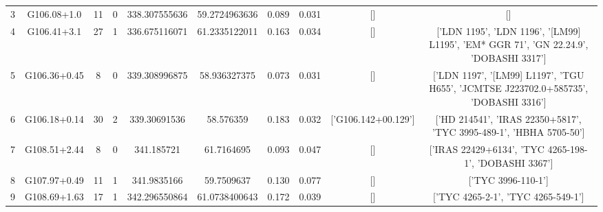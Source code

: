 \begin{table}
\begin{tabular}{cccccccccc}
3 & G106.08+1.0 & 11 & 0 & 338.307555636 & 59.2724963636 & 0.089 & 0.031 & [] & [] \\
4 & G106.41+3.1 & 27 & 1 & 336.675116071 & 61.2335122011 & 0.163 & 0.034 & [] & ['LDN 1195', 'LDN 1196', '[LM99] L1195', 'EM* GGR   71', 'GN 22.24.9', 'DOBASHI 3317'] \\
5 & G106.36+0.45 & 8 & 0 & 339.308996875 & 58.936327375 & 0.073 & 0.031 & [] & ['LDN 1197', '[LM99] L1197', 'TGU H655', 'JCMTSE J223702.0+585735', 'DOBASHI 3316'] \\
6 & G106.18+0.14 & 30 & 2 & 339.30691536 & 58.576359 & 0.183 & 0.032 & ['G106.142+00.129'] & ['HD 214541', 'IRAS 22350+5817', 'TYC 3995-489-1', 'HBHA 5705-50'] \\
7 & G108.51+2.44 & 8 & 0 & 341.185721 & 61.7164695 & 0.093 & 0.047 & [] & ['IRAS 22429+6134', 'TYC 4265-198-1', 'DOBASHI 3367'] \\
8 & G107.97+0.49 & 11 & 1 & 341.9835166 & 59.7509637 & 0.130 & 0.077 & [] & ['TYC 3996-110-1'] \\
9 & G108.69+1.63 & 17 & 1 & 342.296550864 & 61.0738400643 & 0.172 & 0.039 & [] & ['TYC 4265-2-1', 'TYC 4265-549-1'] \\

\end{tabular}
\end{table}
